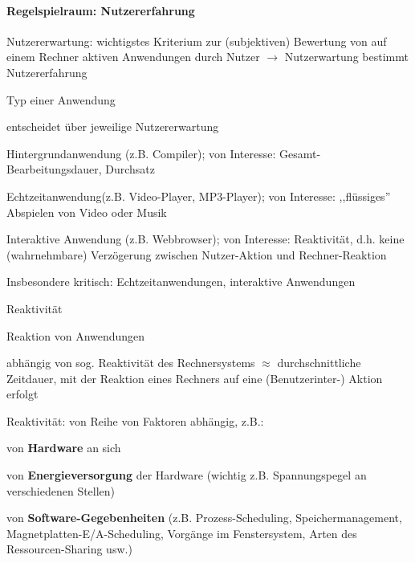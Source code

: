 \documentclass[a4paper]{article}
\begin{document}
\begin{multicols}{3}
    \paragraph{Regelspielraum:
        Nutzererfahrung}

    \begin{itemize*}
        \item
        Nutzererwartung: wichtigstes Kriterium zur (subjektiven) Bewertung von
        auf einem Rechner aktiven Anwendungen durch Nutzer
        $\rightarrow$ Nutzerwartung bestimmt Nutzererfahrung
        \item
        Typ einer Anwendung
        \begin{itemize*}
            \item entscheidet über jeweilige Nutzererwartung \begin{enumerate*} \item Hintergrundanwendung (z.B. Compiler); von Interesse: Gesamt-Bearbeitungsdauer, Durchsatz \item Echtzeitanwendung(z.B. Video-Player, MP3-Player); von Interesse: ,,flüssiges'' Abspielen von Video oder Musik \item Interaktive Anwendung (z.B. Webbrowser); von Interesse: Reaktivität, d.h. keine (wahrnehmbare) Verzögerung zwischen Nutzer-Aktion und Rechner-Reaktion \end{enumerate*}
            \item Insbesondere kritisch: Echtzeitanwendungen, interaktive Anwendungen
        \end{itemize*}
    \end{itemize*}

    Reaktivität

    \begin{itemize*}
        \item
        Reaktion von Anwendungen
        \begin{itemize*}
            \item abhängig von sog. Reaktivität des Rechnersystems $\approx$ durchschnittliche Zeitdauer, mit der Reaktion eines Rechners auf eine (Benutzerinter-) Aktion erfolgt
        \end{itemize*}
        \item
        Reaktivität: von Reihe von Faktoren abhängig, z.B.:
        \begin{enumerate*}

            \item von \textbf{Hardware} an sich
            \item von \textbf{Energieversorgung} der Hardware (wichtig z.B. Spannungspegel an verschiedenen Stellen)
            \item von \textbf{Software-Gegebenheiten} (z.B. Prozess-Scheduling, Speichermanagement, Magnetplatten-E/A-Scheduling, Vorgänge im Fenstersystem, Arten des Ressourcen-Sharing usw.)
        \end{enumerate*}
    \end{itemize*}


\end{multicols}
\end{document}
